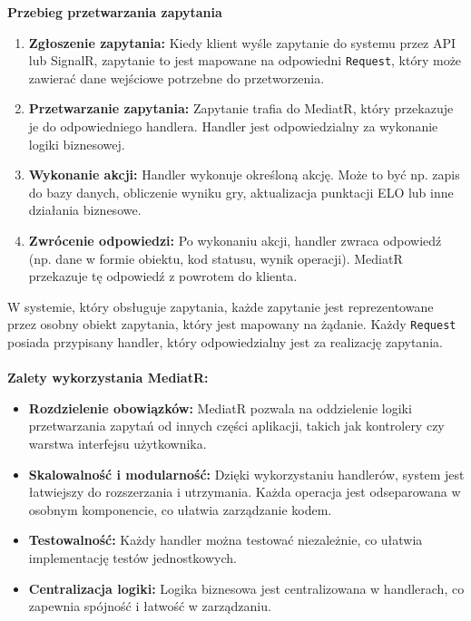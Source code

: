 \documentclass[12pt,a4paper]{article}
\begin{document}
\noindent \textbf{Przebieg przetwarzania zapytania}
\begin{enumerate}
    \item \textbf{Zgłoszenie zapytania:} Kiedy klient wyśle zapytanie do systemu przez API lub SignalR, zapytanie to jest mapowane na odpowiedni \texttt{Request}, który może zawierać dane wejściowe potrzebne do przetworzenia.
    \item \textbf{Przetwarzanie zapytania:} Zapytanie trafia do MediatR, który przekazuje je do odpowiedniego handlera. Handler jest odpowiedzialny za wykonanie logiki biznesowej.
    \item \textbf{Wykonanie akcji:} Handler wykonuje określoną akcję. Może to być np. zapis do bazy danych, obliczenie wyniku gry, aktualizacja punktacji ELO lub inne działania biznesowe.
    \item \textbf{Zwrócenie odpowiedzi:} Po wykonaniu akcji, handler zwraca odpowiedź (np. dane w formie obiektu, kod statusu, wynik operacji). MediatR przekazuje tę odpowiedź z powrotem do klienta.
\end{enumerate}

\noindent
W systemie, który obsługuje zapytania, każde zapytanie jest reprezentowane przez osobny obiekt zapytania, który jest mapowany na żądanie. Każdy \texttt{Request} posiada przypisany handler, który odpowiedzialny jest za realizację zapytania.
\\\\

\noindent \textbf{Zalety wykorzystania MediatR:}
\begin{itemize}
    \item \textbf{Rozdzielenie obowiązków:} MediatR pozwala na oddzielenie logiki przetwarzania zapytań od innych części aplikacji, takich jak kontrolery czy warstwa interfejsu użytkownika.
    \item \textbf{Skalowalność i modularność:} Dzięki wykorzystaniu handlerów, system jest łatwiejszy do rozszerzania i utrzymania. Każda operacja jest odseparowana w osobnym komponencie, co ułatwia zarządzanie kodem.
    \item \textbf{Testowalność:} Każdy handler można testować niezależnie, co ułatwia implementację testów jednostkowych.
    \item \textbf{Centralizacja logiki:} Logika biznesowa jest centralizowana w handlerach, co zapewnia spójność i łatwość w zarządzaniu.
\end{itemize}

\newpage
\end{document}
